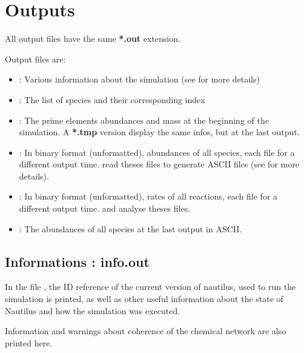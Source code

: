 \documentclass[english,a4paper,twoside]{article}
\begin{document}
\section{Outputs}\label{sec:output-files}
\begin{attention}
All output files have the same \textbf{*.out} extension.
\end{attention}

Output files are:
\begin{itemize}
\item {}: Various information about the simulation (see  for more details)
\item {}: The list of species and their corresponding index
\item {}: The prime elements abundances and mass at the beginning of the simulation. A \textbf{*.tmp} version display the same infos, but at the last output.
\item {}: In binary format (unformatted), abundances of all species, each file for a different output time.  read theses files to generate ASCII files (see  for more details).
\item {}: In binary format (unformatted), rates of all reactions, each file for a different output time.  and  analyse theses files.
\item {}: The abundances of all species at the last output in ASCII.
\end{itemize}

\subsection{Informations : info.out}\label{sec:info-out}
In the file , the ID reference of the current version of nautilus, used to run the simulation is printed, as well as other useful information about the state of Nautilus and how the simulation was executed.

Information and warnings about coherence of the chemical network are also printed here.
\end{document}
